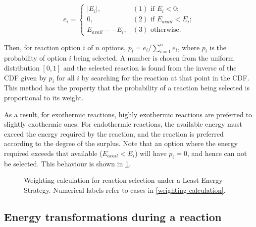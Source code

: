 \begin{displaymath}
	e_i=
	\begin{cases}
		\lvert E_i\rvert, & (1) \text{  if $E_i < 0$;}         \\
		0,                & (2) \text{  if $E_{avail} < E_i$;} \\
		E_{avail}--E_i,   & (3) \text{  otherwise.}            
	\end{cases}
\end{displaymath}\label{weighting-calculation}

Then, for reaction option $i$ of $n$ options, $p_i = e_i / \sum\limits_{i=1}^n e_i$, where $p_i$ is the probability of option $i$ being selected. A number is chosen from the uniform distribution $[0,1]$ and the selected reaction is found from the inverse of the CDF given by $p_i\text{ for all }i$ by searching for the reaction at that point in the CDF. This method has the property that the probability of a reaction being selected is proportional to its weight.

As a result, for exothermic reactions, highly exothermic reactions are preferred to slightly exothermic ones. For endothermic reactions, the available energy must exceed the energy required by the reaction, and the reaction is preferred according to the degree of the surplus. Note that an option where the energy required exceeds that available ($E_{avail} < E_i$) will have $p_i = 0$, and hence can not be selected. This behaviour is shown in \cref{fig:reaction_selection_weights}.

\begin{figure}[t]
	\begin{center}
		\caption{Weighting calculation for reaction selection under a Least Energy Strategy. Numerical labels refer to cases in \cref{weighting-calculation}.}\label{fig:reaction_selection_weights}
	\end{center}
\end{figure}

\subsection{Energy transformations during a reaction}\label{energy-transformations-during-a-reaction}

